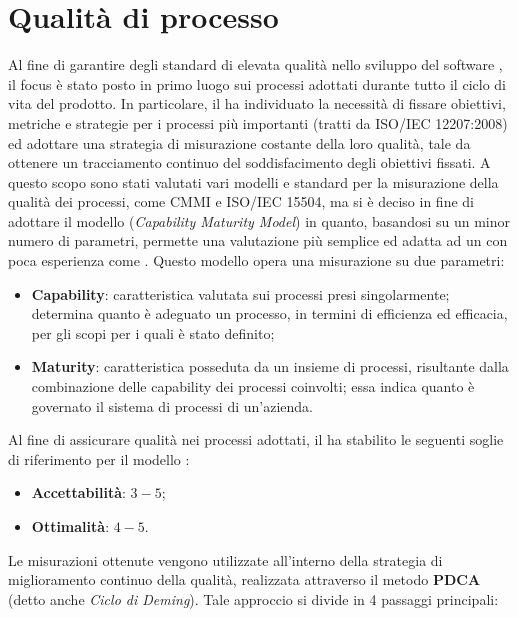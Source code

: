 \section{Qualità di processo}
\label{qualitaProcesso}
Al fine di garantire degli standard di elevata qualità nello sviluppo del software \progetto, il focus è stato posto in primo luogo sui processi adottati durante tutto il ciclo di vita del prodotto.
In particolare, il  ha individuato la necessità di fissare obiettivi, metriche e strategie per i processi più importanti (tratti da ISO/IEC 12207:2008) ed adottare una strategia di misurazione costante della loro qualità, tale da ottenere un tracciamento continuo del soddisfacimento degli obiettivi fissati.
A questo scopo sono stati valutati vari modelli e standard per la misurazione della qualità dei processi, come CMMI e ISO/IEC 15504, ma si è deciso in fine di adottare il modello \textbf{} (\textit{Capability Maturity Model}) in quanto, basandosi su un minor numero di parametri, permette una valutazione più semplice ed adatta ad un  con poca esperienza come \gruppo.
Questo modello opera una misurazione su due parametri:
\begin{itemize}
\item \textbf{Capability}: caratteristica valutata sui processi presi singolarmente; determina quanto è adeguato un processo, in termini di efficienza ed efficacia, per gli scopi per i quali è stato definito;
\item \textbf{Maturity}: caratteristica posseduta da un insieme di processi, risultante dalla combinazione delle capability dei processi coinvolti; essa indica quanto è governato il sistema di processi di un'azienda.
\end{itemize}
Al fine di assicurare qualità nei processi adottati, il  ha stabilito le seguenti soglie di riferimento per il modello :
\begin{itemize}
\item \textbf{Accettabilità}: $3 - 5$;
\item \textbf{Ottimalità}: $4 - 5$.
\end{itemize}
Le misurazioni ottenute vengono utilizzate all'interno della strategia di miglioramento continuo della qualità, realizzata attraverso il metodo \textbf{PDCA} (detto anche \textit{Ciclo di Deming}). Tale approccio si divide in 4 passaggi principali:
